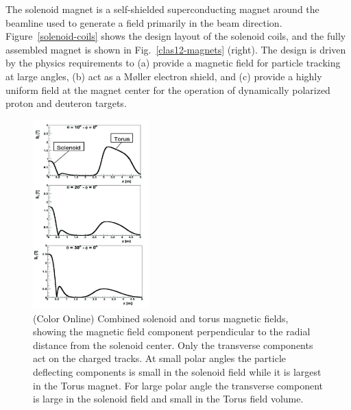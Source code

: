 \documentclass[final,3p,twocolumn]{elsarticle}
\begin{document}
The solenoid magnet is a self-shielded superconducting magnet around the beamline used to generate a field
primarily in the beam direction. Figure~\ref{solenoid-coils} shows the design layout of the solenoid coils, and the
fully assembled magnet is shown in Fig.~\ref{clas12-magnets} (right). The design is driven by the physics
requirements to (a) provide a magnetic field for particle tracking at large angles, (b) act as a M{\o}ller electron
shield, and (c) provide a highly uniform field at the magnet center for the operation of dynamically polarized
proton and deuteron targets.

\begin{figure}[htbp!]
\centerline{\includegraphics[width=0.4\textwidth,height=0.40\textheight]{magfield.png}}
\caption{(Color Online) Combined solenoid and torus magnetic fields, showing the magnetic field component perpendicular 
to the radial distance from the solenoid center. Only
  the transverse components act on the charged tracks. At small polar angles the particle deflecting components is small
  in the solenoid field while it is largest in the Torus magnet. For large polar angle the transverse component is large in 
  the solenoid field and small in the Torus field volume. } 
\label{solenoid-torus}
\vspace{0.5cm}

\end{figure}
\end{document}
